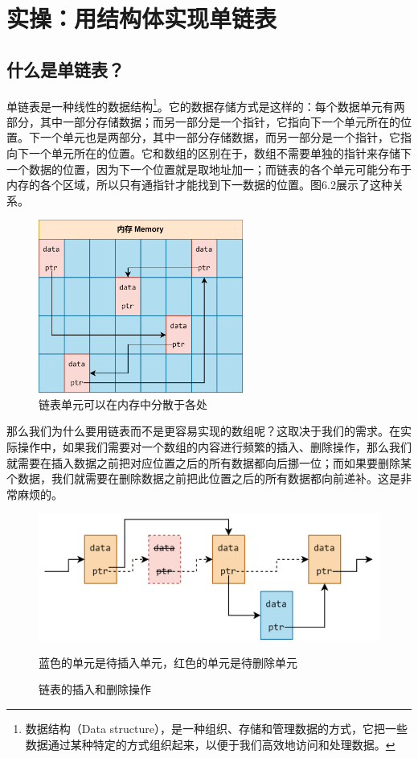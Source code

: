 \section{实操：用结构体实现单链表}
\subsection*{什么是单链表？}
单链表是一种线性的数据结构\footnote{数据结构（Data structure），是一种组织、存储和管理数据的方式，它把一些数据通过某种特定的方式组织起来，以便于我们高效地访问和处理数据。}。它的数据存储方式是这样的：每个数据单元有两部分，其中一部分存储数据；而另一部分是一个指针，它指向下一个单元所在的位置。下一个单元也是两部分，其中一部分存储数据，而另一部分是一个指针，它指向下一个单元所在的位置。它和数组的区别在于，数组不需要单独的指针来存储下一个数据的位置，因为下一个位置就是取地址加一；而链表的各个单元可能分布于内存的各个区域，所以只有通指针才能找到下一数据的位置。图6.2展示了这种关系。\par
\begin{figure}[htbp]
    \centering
    \includegraphics[width=0.6\textwidth]{../images/generalized_parts/06_list_in_the_memory.png}
    \caption{链表单元可以在内存中分散于各处}
\end{figure}
那么我们为什么要用链表而不是更容易实现的数组呢？这取决于我们的需求。在实际操作中，如果我们需要对一个数组的内容进行频繁的插入、删除操作，那么我们就需要在插入数据之前把对应位置之后的所有数据都向后挪一位；而如果要删除某个数据，我们就需要在删除数据之前把此位置之后的所有数据都向前递补。这是非常麻烦的。\par
\begin{figure}[htbp]
    \centering
    \includegraphics[width=\textwidth]{../images/generalized_parts/06_operation_on_list.png}
    \caption{链表的插入和删除操作}
    \footnotesize{蓝色的单元是待插入单元，红色的单元是待删除单元}
\end{figure}

